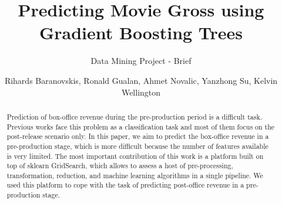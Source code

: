 \documentclass[sigconf]{acmart}
\begin{document}
\title{Predicting Movie Gross using Gradient Boosting Trees}
\subtitle{Data Mining Project - Brief}

\author{Rihards Baranovskis, Ronald  Gualan, Ahmet Novalic, Yanzhong Su, Kelvin Wellington }


\begin{abstract}
Prediction of box-office revenue during the pre-production period is a difficult task. Previous works face this problem as a classification task and most of them focus on the post-release scenario only. In this paper, we aim to predict the box-office revenue in a pre-production stage, which is more difficult because the number of features available is very limited. The most important contribution of this work is a platform built on top of sklearn GridSearch, which allows to assess a host of pre-processing, transformation, reduction, and machine learning algorithms in a single pipeline. We used this platform to cope with the task of predicting post-office revenue in a pre-production stage. 
\end{abstract}



\maketitle




 
\end{document}
